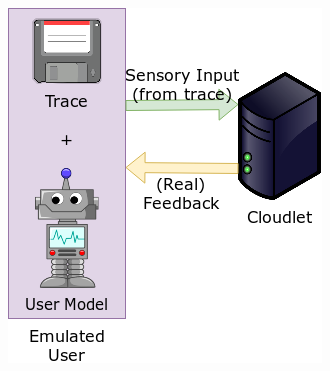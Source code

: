 \documentclass[portrait, a1]{KTHEEposter}
\begin{document}
\begin{pcolumns}[3]
\begin{pcolumn}[2]
\begin{pframe}[1.3]
\begin{center}
                    \includegraphics[width=.75\linewidth]{img/trace_idea_2}
                \end{center}
                
            \end{pframe}
        \end{pcolumn}%
        \begin{pcolumn}[2]
            \begin{pframe}[1.52]

\end{pframe}
\end{pcolumn}
\end{pcolumns}
\end{document}
